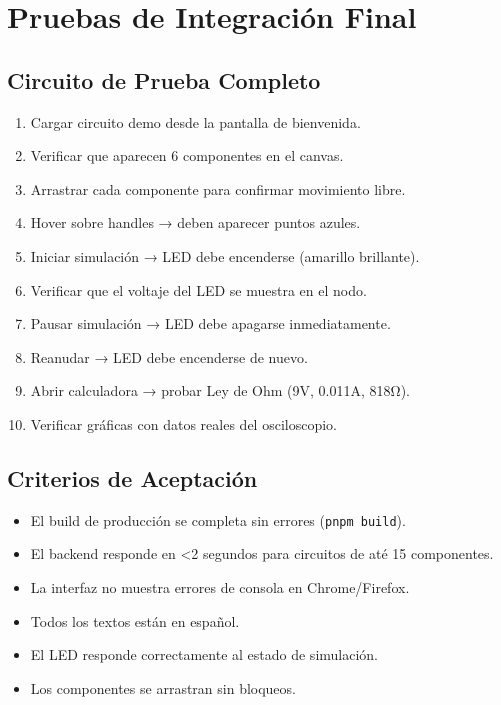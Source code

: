 \documentclass[12pt,a4paper]{article}
\begin{document}
\section{Pruebas de Integración Final}

\subsection{Circuito de Prueba Completo}
\begin{enumerate}
    \item Cargar circuito demo desde la pantalla de bienvenida.
    \item Verificar que aparecen 6 componentes en el canvas.
    \item Arrastrar cada componente para confirmar movimiento libre.
    \item Hover sobre handles → deben aparecer puntos azules.
    \item Iniciar simulación → LED debe encenderse (amarillo brillante).
    \item Verificar que el voltaje del LED se muestra en el nodo.
    \item Pausar simulación → LED debe apagarse inmediatamente.
    \item Reanudar → LED debe encenderse de nuevo.
    \item Abrir calculadora → probar Ley de Ohm (9V, 0.011A, 818Ω).
    \item Verificar gráficas con datos reales del osciloscopio.
\end{enumerate}

\subsection{Criterios de Aceptación}
\begin{itemize}
    \item El build de producción se completa sin errores (\texttt{pnpm build}).
    \item El backend responde en <2 segundos para circuitos de até 15 componentes.
    \item La interfaz no muestra errores de consola en Chrome/Firefox.
    \item Todos los textos están en español.
    \item El LED responde correctamente al estado de simulación.
    \item Los componentes se arrastran sin bloqueos.
\end{itemize}
\end{document}
